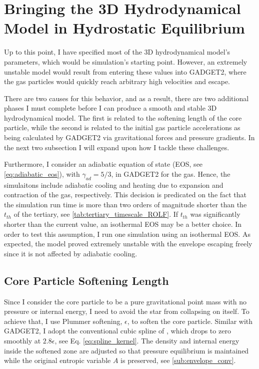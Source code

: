 \section{Bringing the 3D Hydrodynamical Model in Hydrostatic Equilibrium}

Up to this point, I have specified most of the 3D hydrodynamical model's parameters, which would be simulation's starting point. However, an extremely unstable model would result from entering these values into GADGET2, where the gas particles would quickly reach arbitrary high velocities and escape.

There are two causes for this behavior, and as a result, there are two additional phases I must complete before I can produce a smooth and stable 3D hydrodynamical model. The first is related to the softening length of the core particle, while the second is related to the initial gas particle accelerations as being calculated by GADGET2 via gravitational forces and pressure gradients. In the next two subsection I will expand upon how I tackle these challenges. 

Furthermore, I consider an adiabatic equation of state (EOS, see \cref{eq:adiabatic_eos}), with $\gamma_{ad} = 5/3$, in GADGET2 for the gas. Hence, the simulaitons include adiabatic cooling and heating due to expansion and contraction of the gas, respectively. This decision is predicated on the fact that the simulation run time is more than two orders of magnitude shorter than the $t_{th}$ of the tertiary, see \cref{tab:tertiary_timescale_ROLF}. If $t_{th}$ was significantly shorter than the current value, an isothermal EOS may be a better choice. In order to test this assumption, I run one simulation using an isothermal EOS. As expected, the model proved extremely unstable with the envelope escaping freely since it is not affected by adiabatic cooling.

\subsection{Core Particle Softening Length}

Since I consider the core particle to be a pure gravitational point mass with no pressure or internal energy, I need to avoid the star from collapsing on itself.
To achieve that, I use Plummer softening, $\epsilon$, to soften the core particle. Similar with GADGET2, I adopt the conventional cubic spline of \cite{monaghan1985refined}, which drops to zero smoothly at $2.8 \epsilon$, see Eq. \eqref{eq:spline_kernel}. The density and internal energy inside the softened zone are adjusted so that pressure equilibrium is maintained while the original entropic variable $A$ is preserved, see \cref{sub:envelope_conv}. 

